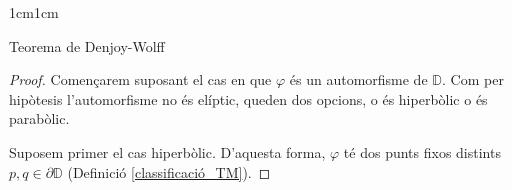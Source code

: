 \begin{adjustwidth}{1cm}{1cm}
\begin{subsection}{Teorema de Denjoy-Wolff}
\begin{teorema}
    \end{teorema}

    \begin{proof}
        Començarem suposant el cas en que $\varphi$ és un automorfisme de $\mathbb{D}$. Com per hipòtesis l'automorfisme no és elíptic, queden dos opcions, o és hiperbòlic o és parabòlic. 



        
        
        
        
        
        Suposem primer el cas hiperbòlic. D'aquesta forma, $\varphi$ té dos punts fixos distints $p,q\in\partial\mathbb{D}$ (Definició \ref{classificació_TM}).


\end{proof}
\end{subsection}
\end{adjustwidth}
